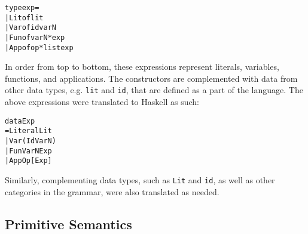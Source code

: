 \begin{alltt}
type exp =
  | Lit of lit
  | Var of id varN
  | Fun of varN * exp
  | App of op * list exp
\end{alltt}

\noindent In order from top to bottom, these expressions represent literals,
variables, functions, and applications. The constructors are complemented with
data from other data types, e.g. \texttt{lit} and \texttt{id}, that are defined
as a part of the language.
The above expressions were translated to Haskell as such:

\begin{alltt}
data Exp
  = Literal Lit
  | Var (Id VarN)
  | Fun VarN Exp
  | App Op [Exp]
\end{alltt}

\noindent Similarly, complementing data types, such as \texttt{Lit} and \texttt{id},
as well as other categories in the grammar, were also translated as needed.

\subsection{Primitive Semantics}
